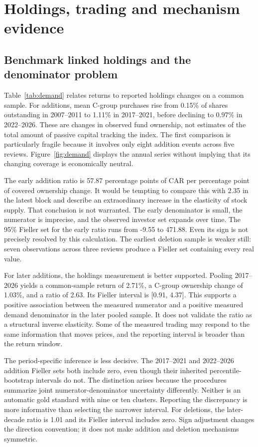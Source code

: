 \section{Holdings, trading and mechanism evidence}
\subsection{Benchmark linked holdings and the denominator problem}

Table~\ref{tab:demand} relates returns to reported holdings changes on a common sample. For additions, mean C-group purchases rise from 0.15\% of shares outstanding in 2007--2011 to 1.11\% in 2017--2021, before declining to 0.97\% in 2022--2026. These are changes in observed fund ownership, not estimates of the total amount of passive capital tracking the index. The first comparison is particularly fragile because it involves only eight addition events across five reviews. Figure~\ref{fig:demand} displays the annual series without implying that its changing coverage is economically neutral.



The early addition ratio is 57.87 percentage points of CAR per percentage point of covered ownership change. It would be tempting to compare this with 2.35 in the latest block and describe an extraordinary increase in the elasticity of stock supply. That conclusion is not warranted. The early denominator is small, the numerator is imprecise, and the observed investor set expands over time. The 95\% Fieller set for the early ratio runs from -9.55 to 471.88. Even its sign is not precisely resolved by this calculation. The earliest deletion sample is weaker still: seven observations across three reviews produce a Fieller set containing every real value.

For later additions, the holdings measurement is better supported. Pooling 2017--2026 yields a common-sample return of 2.71\%, a C-group ownership change of 1.03\%, and a ratio of 2.63. Its Fieller interval is [0.91, 4.37]. This supports a positive association between the measured numerator and a positive measured demand denominator in the later pooled sample. It does not validate the ratio as a structural inverse elasticity. Some of the measured trading may respond to the same information that moves prices, and the reporting interval is broader than the return window.

The period-specific inference is less decisive. The 2017--2021 and 2022--2026 addition Fieller sets both include zero, even though their inherited percentile-bootstrap intervals do not. The distinction arises because the procedures summarize joint numerator-denominator uncertainty differently. Neither is an automatic gold standard with nine or ten clusters. Reporting the discrepancy is more informative than selecting the narrower interval. For deletions, the later-decade ratio is 1.01 and its Fieller interval includes zero. Sign adjustment changes the direction convention; it does not make addition and deletion mechanisms symmetric.

